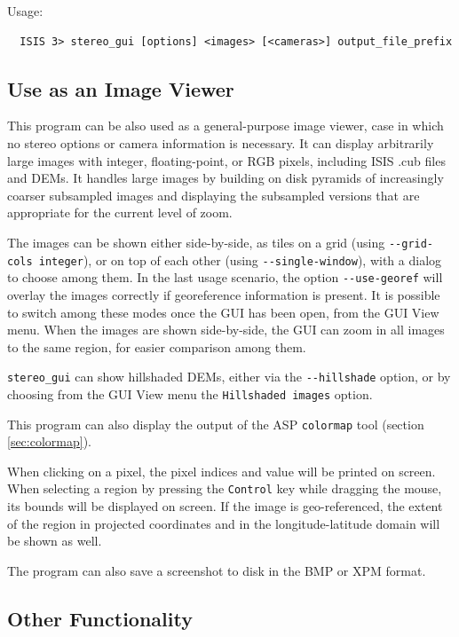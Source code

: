 Usage:
\begin{verbatim}
  ISIS 3> stereo_gui [options] <images> [<cameras>] output_file_prefix
\end{verbatim}

\subsection{Use as an Image Viewer}

This program can be also used as a general-purpose image viewer, case in
which no stereo options or camera information is necessary.  It can
display arbitrarily large images with integer, floating-point, or RGB
pixels, including ISIS .cub files and DEMs. It handles large images by
building on disk pyramids of increasingly coarser subsampled images and
displaying the subsampled versions that are appropriate for the current
level of zoom.

The images can be shown either side-by-side, as tiles on a grid (using
\texttt{-\/-grid-cols integer}), or on top of each other (using
\texttt{-\/-single-window}), with a dialog to choose among them.  In the
last usage scenario, the option \texttt{-\/-use-georef} will overlay the
images correctly if georeference information is present.  It is possible
to switch among these modes once the GUI has been open, from the GUI
View menu. When the images are shown side-by-side, the GUI can zoom
in all images to the same region, for easier comparison among them.

\texttt{stereo\_gui} can show hillshaded DEMs, either via the
\texttt{-\/-hillshade} option, or by choosing from the GUI View menu the
\texttt{Hillshaded images} option.

This program can also display the output of the ASP \texttt{colormap}
tool (section \ref{sec:colormap}).

When clicking on a pixel, the pixel indices and value will be printed on screen.
When selecting a region by pressing the \texttt{Control} key while dragging the mouse, 
its bounds will be displayed on screen. If the image is geo-referenced,
the extent of the region in projected coordinates and in the longitude-latitude domain 
will be shown as well. 

The program can also save a screenshot to disk in the BMP or XPM format. 

\subsection{Other Functionality}

